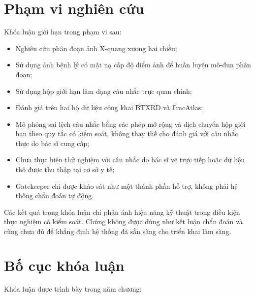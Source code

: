 \section{Phạm vi nghiên cứu}
\label{sec:pham_vi}

Khóa luận giới hạn trong phạm vi sau:

\begin{itemize}
    \item Nghiên cứu phân đoạn ảnh X-quang xương hai chiều;
    \item Sử dụng ảnh bệnh lý có mặt nạ cấp độ điểm ảnh để huấn luyện mô-đun phân đoạn;
    \item Sử dụng hộp giới hạn làm dạng câu nhắc trực quan chính;
    \item Đánh giá trên hai bộ dữ liệu công khai BTXRD và FracAtlas;
    \item Mô phỏng sai lệch câu nhắc bằng các phép mở rộng và dịch chuyển hộp giới hạn theo quy tắc có kiểm soát, không thay thế cho đánh giá với câu nhắc thực do bác sĩ cung cấp;
    \item Chưa thực hiện thử nghiệm với câu nhắc do bác sĩ vẽ trực tiếp hoặc dữ liệu thô được thu thập tại cơ sở y tế;
    \item Gatekeeper chỉ được khảo sát như một thành phần hỗ trợ, không phải hệ thống chẩn đoán tự động.
\end{itemize}

Các kết quả trong khóa luận chỉ phản ánh hiệu năng kỹ thuật trong điều kiện thực nghiệm có kiểm soát. Chúng không được dùng như kết luận chẩn đoán và cũng chưa đủ để khẳng định hệ thống đã sẵn sàng cho triển khai lâm sàng.
\section{Bố cục khóa luận}
\label{sec:bo_cuc}

Khóa luận được trình bày trong năm chương:

